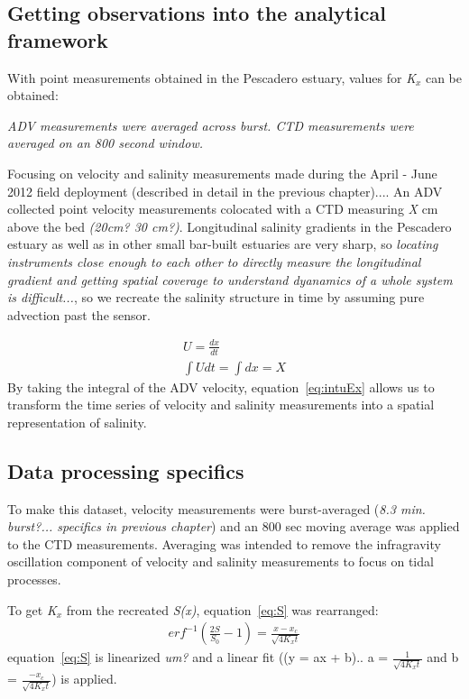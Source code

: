 \subsection{Getting observations into the analytical framework} \label{ssec:ObsInto1DAdvDiff}


With point measurements obtained in the Pescadero estuary, values for \emph{K$_x$} can be obtained: 

\emph{ADV measurements were averaged across burst. CTD measurements were averaged on an 800 second window.}

Focusing on velocity and salinity measurements made during the April - June 2012 field deployment (described in detail in the previous chapter).... An ADV collected point velocity measurements colocated with a CTD measuring \emph{X} cm above the bed \emph{(20cm? 30 cm?)}. Longitudinal salinity gradients in the Pescadero estuary as well as in other small bar-built estuaries are very sharp, so \emph{locating instruments close enough to each other to directly measure the longitudinal gradient and getting spatial coverage to understand dyanamics of a whole system is difficult...}, so we recreate the salinity structure in time by assuming pure advection past the sensor. 

\begin{eqnarray}
U = \frac{dx}{dt} \label{eq:uEdxdt}\\
\int{Udt} = \int{dx} = X \label{eq:intuEx}
\end{eqnarray}
By taking the integral of the ADV velocity, equation~\ref{eq:intuEx} allows us to transform the time series of velocity and salinity measurements into a spatial representation of salinity.

\subsection{Data processing specifics} \label{ssec:DataProcessing}
To make this dataset, velocity measurements were burst-averaged (\emph{8.3 min. burst?... specifics in previous chapter}) and an 800 sec moving average was applied to the CTD measurements.  Averaging was intended to remove the infragravity oscillation component of velocity and salinity measurements to focus on tidal processes. 

To get \emph{K$_x$} from the recreated \emph{S(x)}, equation~\ref{eq:S} was rearranged:
\begin{eqnarray}
erf^{-1}\left(\frac{2S}{S_0}-1\right) = \frac{x-x_c}{\sqrt{4K_xt}} \label{eq:linfitS}
\end{eqnarray}
equation~\ref{eq:S} is linearized \emph{um?} and a linear fit ((y = ax + b).. a = $\frac{1}{\sqrt{4K_xt}}$ and b = $\frac{-x_c}{\sqrt{4K_xt}}$) is applied. 



